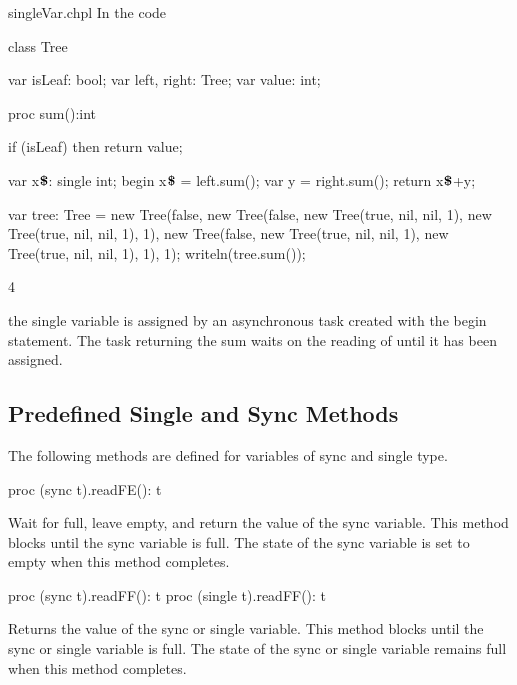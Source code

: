\begin{chapelexample}{singleVar.chpl}
In the code
\begin{chapel}
class Tree {
  var isLeaf: bool;
  var left, right: Tree;
  var value: int;

  proc sum():int {
    if (isLeaf) then 
       return value;

    var x$\mbox{{\bf \$}}$: single int;
    begin x$\mbox{{\bf \$}}$ = left.sum();
    var y = right.sum();
    return x$\mbox{{\bf \$}}$+y;
  }
}
\end{chapel}
\begin{chapelpost}
var tree: Tree = new Tree(false, new Tree(false, new Tree(true, nil, nil, 1),
                                                 new Tree(true, nil, nil, 1), 1),
                                 new Tree(false, new Tree(true, nil, nil, 1),
                                                 new Tree(true, nil, nil, 1), 1), 1);
writeln(tree.sum());
\end{chapelpost}
\begin{chapeloutput}
4
\end{chapeloutput}
the single variable  is assigned by an
asynchronous task created with the begin statement.  The task
returning the sum waits on the reading of 
until it has been assigned.
\end{chapelexample}

\subsection{Predefined Single and Sync Methods}
\label{Functions_on_Synchronization_Variables}

The following methods are defined for variables of sync and single
type.

\begin{protohead}
proc (sync t).readFE(): t
\end{protohead}
\begin{protobody}
Wait for full, leave empty, and return the value of the sync variable.
This method blocks until the sync variable is full.  The state of the
sync variable is set to empty when this method completes.
\end{protobody}

\begin{protohead}
proc (sync t).readFF(): t
proc (single t).readFF(): t
\end{protohead}
\begin{protobody}
Returns the value of the sync or single variable.  This method blocks
until the sync or single variable is full.  The state of the sync or
single variable remains full when this method completes.
\end{protobody}

